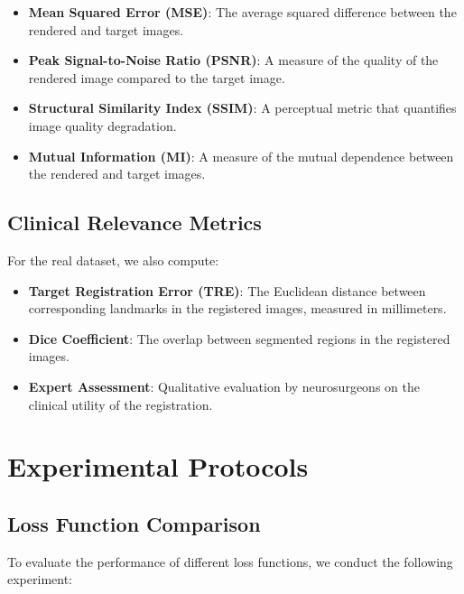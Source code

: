 \begin{itemize}
    \item \textbf{Mean Squared Error (MSE)}: The average squared difference between the rendered and target images.
    \item \textbf{Peak Signal-to-Noise Ratio (PSNR)}: A measure of the quality of the rendered image compared to the target image.
    \item \textbf{Structural Similarity Index (SSIM)}: A perceptual metric that quantifies image quality degradation.
    \item \textbf{Mutual Information (MI)}: A measure of the mutual dependence between the rendered and target images.
\end{itemize}

\subsection{Clinical Relevance Metrics}
For the real dataset, we also compute:

\begin{itemize}
    \item \textbf{Target Registration Error (TRE)}: The Euclidean distance between corresponding landmarks in the registered images, measured in millimeters.
    \item \textbf{Dice Coefficient}: The overlap between segmented regions in the registered images.
    \item \textbf{Expert Assessment}: Qualitative evaluation by neurosurgeons on the clinical utility of the registration.
\end{itemize}

\section{Experimental Protocols}

\subsection{Loss Function Comparison}
To evaluate the performance of different loss functions, we conduct the following experiment:


